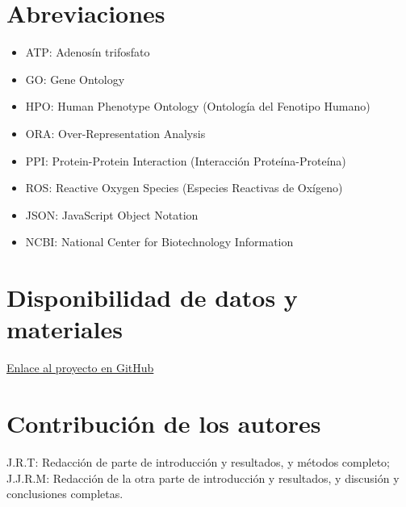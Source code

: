 \documentclass{bmcart}
\begin{document}
	\begin{backmatter}
	
		\section*{Abreviaciones}%
			\begin{itemize}
				\item ATP: Adenosín trifosfato
				\item GO: Gene Ontology
				\item HPO: Human Phenotype Ontology (Ontología del Fenotipo Humano)
				\item ORA: Over-Representation Analysis
				\item PPI: Protein-Protein Interaction (Interacción Proteína-Proteína)
				\item ROS: Reactive Oxygen Species (Especies Reactivas de Oxígeno)
				\item JSON: JavaScript Object Notation
				\item NCBI: National Center for Biotechnology Information
			\end{itemize}
		
		\section*{Disponibilidad de datos y materiales}%
			\href{https://github.com/juliadelrio0/project_template}{Enlace al proyecto en GitHub}
			
		
		\section*{Contribución de los autores}			
			J.R.T: Redacción de parte de introducción y resultados, y métodos completo; J.J.R.M: Redacción de la otra parte de introducción y resultados, y discusión y conclusiones completas.
		
		
		
	
	\end{backmatter}
\end{document}
